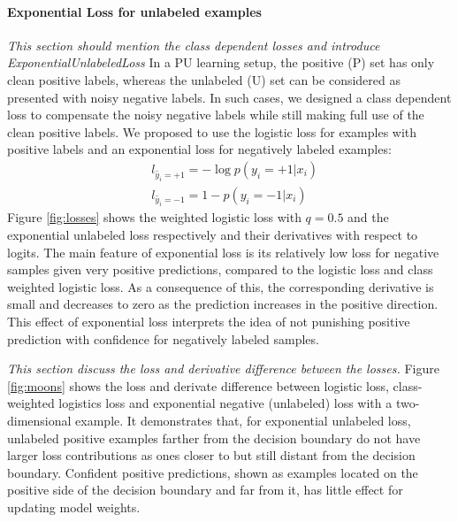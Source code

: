 \paragraph{Exponential Loss for unlabeled examples}
\noindent
\noindent \textit{This section should mention the class dependent losses and introduce ExponentialUnlabeledLoss}
In a PU learning setup, the positive (P) set has only clean positive labels, whereas the unlabeled (U) set can be considered as presented with noisy negative labels.
In such cases, we designed a class dependent loss to compensate the noisy negative labels while still making full use of the clean positive labels.
We proposed to use the logistic loss for examples with positive labels and an exponential loss \cite{tax2016class} for negatively labeled examples:
\begin{equation*}
  \begin{aligned}
    & l_{\tilde{y_i}=+1} = - \log p(y_i=+1 \vert x_i) \\
    & l_{\tilde{y_i}=-1} = 1 - p(y_i=-1|x_i)
  \end{aligned}
\end{equation*}
Figure \ref{fig:losses} shows the weighted logistic loss with $q=0.5$ and the exponential unlabeled loss respectively and their derivatives with respect to logits.
The main feature of exponential loss is its relatively low loss for negative samples given very positive predictions, compared to the logistic loss and class weighted logistic loss.
As a consequence of this, the corresponding derivative is small and decreases to zero as the prediction increases in the positive direction.
This effect of exponential loss interprets the idea of not punishing positive prediction with confidence for negatively labeled samples.


\noindent \textit{This section discuss the loss and derivative difference between the losses.}
\noindent
Figure \ref{fig:moons} shows the loss and derivate difference between logistic loss, class-weighted logistics loss and exponential negative (unlabeled) loss with a two-dimensional example.
It demonstrates that, for exponential unlabeled loss, unlabeled positive examples farther from the decision boundary do not have larger loss contributions as ones closer to but still distant from the decision boundary.
Confident positive predictions, shown as examples located on the positive side of the decision boundary and far from it, has little effect for updating model weights.


